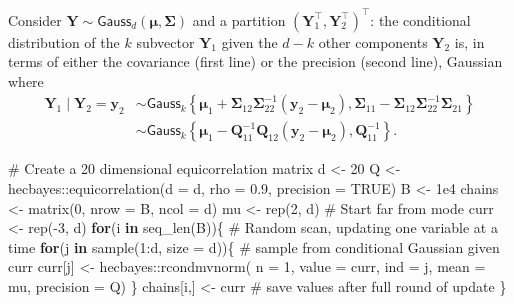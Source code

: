 \documentclass[
  11pt,
  letterpaper,
]{scrbook}
\newenvironment{Shaded}{\begin{snugshade}}{\end{snugshade}}
\newcommand{\AttributeTok}[1]{\textcolor[rgb]{0.40,0.45,0.13}{#1}}
\newcommand{\CommentTok}[1]{\textcolor[rgb]{0.37,0.37,0.37}{#1}}
\newcommand{\ConstantTok}[1]{\textcolor[rgb]{0.56,0.35,0.01}{#1}}
\newcommand{\ControlFlowTok}[1]{\textcolor[rgb]{0.00,0.23,0.31}{\textbf{#1}}}
\newcommand{\DecValTok}[1]{\textcolor[rgb]{0.68,0.00,0.00}{#1}}
\newcommand{\FloatTok}[1]{\textcolor[rgb]{0.68,0.00,0.00}{#1}}
\newcommand{\FunctionTok}[1]{\textcolor[rgb]{0.28,0.35,0.67}{#1}}
\newcommand{\NormalTok}[1]{\textcolor[rgb]{0.00,0.23,0.31}{#1}}
\newcommand{\OtherTok}[1]{\textcolor[rgb]{0.00,0.23,0.31}{#1}}
\newcommand{\SpecialCharTok}[1]{\textcolor[rgb]{0.37,0.37,0.37}{#1}}
\theoremstyle{definition}
\theoremstyle{plain}
\theoremstyle{plain}
\theoremstyle{plain}
\theoremstyle{definition}
\theoremstyle{definition}
\theoremstyle{plain}
\theoremstyle{plain}
\theoremstyle{remark}
\begin{document}
Consider
\(\boldsymbol{Y} \sim \mathsf{Gauss}_d(\boldsymbol{\mu}, \boldsymbol{\Sigma})\)
and a partition \((\boldsymbol{Y}_1^\top, \boldsymbol{Y}_2^\top)^\top\):
the conditional distribution of the \(k\) subvector \(\boldsymbol{Y}_1\)
given the \(d-k\) other components \(\boldsymbol{Y}_2\) is, in terms of
either the covariance (first line) or the precision (second line),
Gaussian where \begin{align*}
\boldsymbol{Y}_1 \mid \boldsymbol{Y}_2=\boldsymbol{y}_2 &\sim \mathsf{Gauss}_{k}\left\{ \boldsymbol{\mu}_1 + \boldsymbol{\Sigma}_{12} \boldsymbol{\Sigma}_{22}^{-1}(\boldsymbol{y}_2 - \boldsymbol{\mu}_2), \boldsymbol{\Sigma}_{11} - \boldsymbol{\Sigma}_{12}\boldsymbol{\Sigma}_{22}^{-1}\boldsymbol{\Sigma}_{21}\right\}
\\&\sim \mathsf{Gauss}_{k}\left\{ \boldsymbol{\mu}_1 -\mathbf{Q}_{11}^{-1}\mathbf{Q}_{12}(\boldsymbol{y}_2 - \boldsymbol{\mu}_2), \mathbf{Q}_{11}^{-1}\right\}.
\end{align*}

\begin{Shaded}
\begin{Highlighting}[]
\CommentTok{\# Create a 20 dimensional equicorrelation matrix}
\NormalTok{d }\OtherTok{\textless{}{-}} \DecValTok{20}
\NormalTok{Q }\OtherTok{\textless{}{-}}\NormalTok{ hecbayes}\SpecialCharTok{::}\FunctionTok{equicorrelation}\NormalTok{(}\AttributeTok{d =}\NormalTok{ d, }\AttributeTok{rho =} \FloatTok{0.9}\NormalTok{, }\AttributeTok{precision =} \ConstantTok{TRUE}\NormalTok{)}
\NormalTok{B }\OtherTok{\textless{}{-}} \FloatTok{1e4}
\NormalTok{chains }\OtherTok{\textless{}{-}} \FunctionTok{matrix}\NormalTok{(}\DecValTok{0}\NormalTok{, }\AttributeTok{nrow =}\NormalTok{ B, }\AttributeTok{ncol =}\NormalTok{ d)}
\NormalTok{mu }\OtherTok{\textless{}{-}} \FunctionTok{rep}\NormalTok{(}\DecValTok{2}\NormalTok{, d)}
\CommentTok{\# Start far from mode}
\NormalTok{curr }\OtherTok{\textless{}{-}} \FunctionTok{rep}\NormalTok{(}\SpecialCharTok{{-}}\DecValTok{3}\NormalTok{, d)}
\ControlFlowTok{for}\NormalTok{(i }\ControlFlowTok{in} \FunctionTok{seq\_len}\NormalTok{(B))\{}
  \CommentTok{\# Random scan, updating one variable at a time}
  \ControlFlowTok{for}\NormalTok{(j }\ControlFlowTok{in} \FunctionTok{sample}\NormalTok{(}\DecValTok{1}\SpecialCharTok{:}\NormalTok{d, }\AttributeTok{size =}\NormalTok{ d))\{}
    \CommentTok{\# sample from conditional Gaussian given curr}
\NormalTok{    curr[j] }\OtherTok{\textless{}{-}}\NormalTok{ hecbayes}\SpecialCharTok{::}\FunctionTok{rcondmvnorm}\NormalTok{(}
      \AttributeTok{n =} \DecValTok{1}\NormalTok{,}
      \AttributeTok{value =}\NormalTok{ curr,}
      \AttributeTok{ind =}\NormalTok{ j,}
      \AttributeTok{mean =}\NormalTok{ mu,}
      \AttributeTok{precision =}\NormalTok{ Q)}
\NormalTok{  \}}
\NormalTok{  chains[i,] }\OtherTok{\textless{}{-}}\NormalTok{ curr }\CommentTok{\# save values after full round of update}
\NormalTok{\}}
\end{Highlighting}
\end{Shaded}
\end{document}
